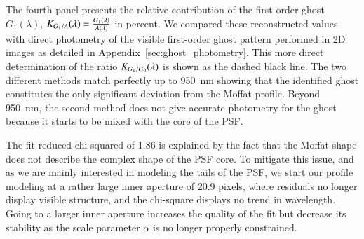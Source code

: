 The fourth panel presents the relative contribution of the first order
ghost $G_1(\lambda)$,
$K_{G_1/A}(\lambda) = \frac{G_1(\lambda)}{A(\lambda)}$ in
percent. We compared these reconstructed values with direct photometry
of the visible first-order ghost pattern performed in 2D images as
detailed in Appendix~\ref{sec:ghost_photometry}. This more direct
determination of the ratio $K_{G_1/G_0}(\lambda)$ is shown as the dashed black
line. The two different methods match perfectly up to \SI{950}{nm}
showing that the identified ghost constitutes the only significant
deviation from the Moffat profile. Beyond \SI{950}{nm}, the second method
does not give accurate photometry for the ghost because it starts
to be mixed with the core of the PSF.


The fit reduced chi-squared of 1.86 is explained by the fact that the Moffat
shape does not describe the complex shape of the PSF core. To mitigate this
issue, and as we are mainly interested in modeling the tails of the PSF, we
start our profile modeling at a rather large inner aperture of 20.9 pixels, where
residuals no longer display visible structure, and the chi-square displays no
trend in wavelength. Going to a larger inner aperture increases the quality of
the fit but decrease its stability as the scale parameter $\alpha$ is no longer
properly constrained.

